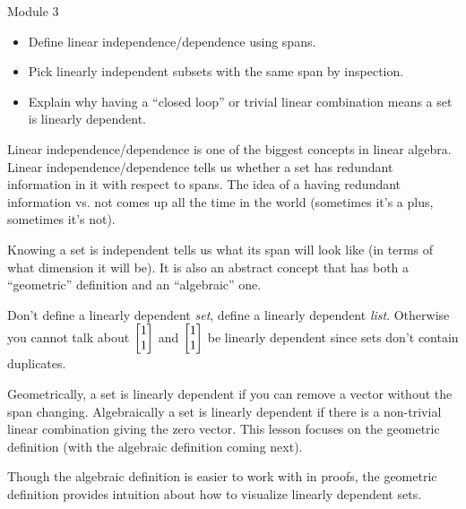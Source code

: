 \begin{lesson}

	Module 3

	\begin{itemize}
		\item Define linear independence/dependence using spans.
		\item Pick linearly independent subsets with the same span by inspection.
		\item Explain why having a ``closed loop'' or trivial linear combination
			means a set is linearly dependent.
	\end{itemize}

	Linear independence/dependence is one of the biggest concepts in linear algebra.
	Linear independence/dependence tells us whether a set has redundant information
	in it with respect to spans. The idea of a having redundant information vs\mbox{.}
	not comes up all the time in the world (sometimes it's a plus, sometimes it's not).

	Knowing
	a set is independent tells us what its span will look like (in terms of what dimension
	it will be). It is also an abstract concept that has both a ``geometric'' definition
	and an ``algebraic'' one.
	\begin{annotation}
		\begin{notes}
			Don't define a linearly dependent \emph{set}, define
			a linearly dependent \emph{list}. Otherwise you cannot talk about
			$\mat{1\\1}$ and $\mat{1\\1}$ be linearly dependent since sets don't
			contain duplicates.
		\end{notes}
	\end{annotation}
	Geometrically, a set is linearly dependent if you can remove
	a vector without the span changing. Algebraically a set is linearly dependent if there
	is a non-trivial linear combination giving the zero vector. This lesson focuses on the
	geometric definition (with the algebraic definition coming next).

	Though the algebraic definition is easier to work with in proofs, the geometric definition
	provides intuition about how to visualize linearly
	dependent sets.

\end{lesson}

